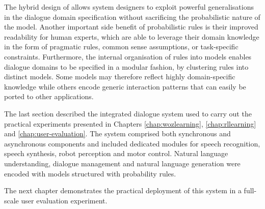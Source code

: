 The hybrid design  of \opendial{} allows system designers to exploit powerful generalisations in the dialogue domain specification without sacrificing the probabilistic nature of the model. Another important side benefit of probabilistic rules is their improved readability for human experts, which are able to leverage their domain knowledge in the form of pragmatic rules, common sense assumptions, or task-specific constraints. Furthermore, the internal organisation of rules into models enables dialogue domains to be specified in a modular fashion, by clustering rules into distinct models.  Some models may therefore reflect highly domain-specific knowledge while others encode generic interaction patterns that can easily be ported to other applications.  

The last section described the integrated dialogue system used to carry out the practical experiments presented in Chapters \ref{chap:wozlearning}, \ref{chap:rllearning} and \ref{chap:user-evaluation}.  The system comprised both synchronous and asynchronous components and included dedicated modules for speech recognition, speech synthesis, robot perception and motor control.  Natural language understanding, dialogue management and natural language generation were encoded with models structured with probability rules. 

The next chapter demonstrates the practical deployment of this system in a full-scale user evaluation experiment. 